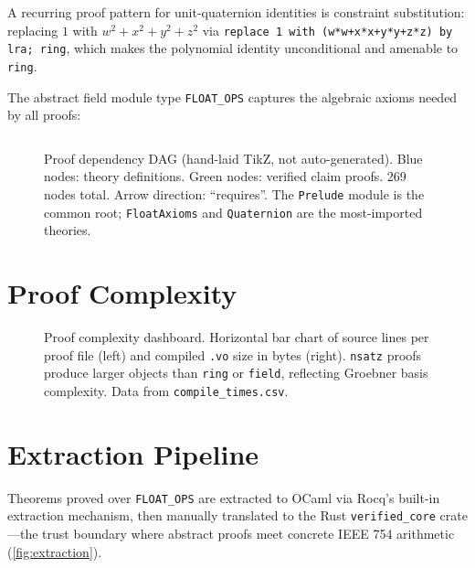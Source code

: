 \documentclass[12pt,openany]{report}
\theoremstyle{definition}
\theoremstyle{plain}
\theoremstyle{remark}
\newcommand{\prooffilecount}{269}
\newcommand{\proofmetrics}{data}
\begin{document}
A recurring proof pattern for unit-quaternion identities is constraint
substitution: replacing $1$ with $w^2 + x^2 + y^2 + z^2$ via
\texttt{replace 1 with (w*w+x*x+y*y+z*z) by lra; ring}, which
makes the polynomial identity unconditional and amenable to
\texttt{ring}.

The abstract field module type \texttt{FLOAT\_OPS} captures the algebraic
axioms needed by all proofs:

\inputminted[firstline=17,lastline=44,fontsize=\scriptsize]{coq}{theories/FloatAxioms.v}

\begin{figure}[htbp]
\centering

\caption{Proof dependency DAG (hand-laid TikZ, not auto-generated).
Blue nodes: theory definitions.  Green nodes: verified claim proofs.
\prooffilecount{} nodes total.  Arrow direction: ``requires''.
The \texttt{Prelude} module is the common root; \texttt{FloatAxioms}
and \texttt{Quaternion} are the most-imported theories.}
\label{fig:proof-dag}
\end{figure}

\section{Proof Complexity}

\pgfplotstableread[col sep=comma, columns/file/.style={string type}]{\proofmetrics/compile_times.csv}\compiletimesdata

\begin{figure}[htbp]
\centering

\caption{Proof complexity dashboard.  Horizontal bar chart of source
lines per proof file (left) and compiled \texttt{.vo} size in bytes
(right).  \texttt{nsatz} proofs produce larger objects than
\texttt{ring} or \texttt{field}, reflecting Groebner basis complexity.
Data from \texttt{compile\_times.csv}.}
\label{fig:proof-complexity}
\end{figure}

\section{Extraction Pipeline}

Theorems proved over \texttt{FLOAT\_OPS} are extracted to OCaml via Rocq's
built-in extraction mechanism, then manually translated to the Rust
\texttt{verified\_core} crate---the trust boundary where abstract proofs
meet concrete IEEE 754 arithmetic (\cref{fig:extraction}).
\end{document}
